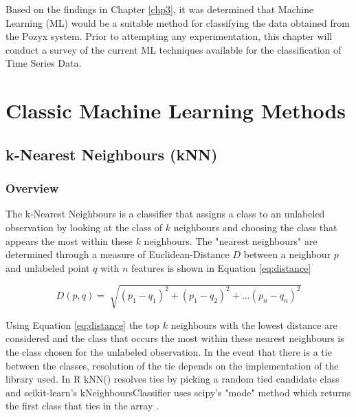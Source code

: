Based on the findings in Chapter \ref{chp3}, it was determined that Machine Learning (ML) would be a suitable method for classifying the data obtained from the Pozyx system. Prior to attempting any experimentation, this chapter will conduct a survey of the current ML techniques available for the classification of Time Series Data. 


\section{Classic Machine Learning Methods}
\subsection{k-Nearest Neighbours (kNN)}
\subsubsection{Overview}
The k-Nearest Neighbours is a classifier that assigns a class to an unlabeled observation by looking at the class of $k$ neighbours and choosing the class that appears the most within these $k$ neighbours. The "nearest neighbours" are determined through a measure of Euclidean-Distance $D$ between a neighbour $p$ and unlabeled point $q$ with $n$ features is shown in Equation \ref{eq:distance} \cite{zhangIntroductionMachineLearning2016}

\begin{equation}
    D(p, q) = \sqrt[]{(p_1 - q_1)^2 + (p_1 - q_2)^2 + ... (p_n - q_n)^2}
    \label{eq:distance}
\end{equation}

Using Equation \ref{eq:distance} the top $k$ neighbours with the lowest distance are considered and the class that occurs the most within these nearest neighbours is the class chosen for the unlabeled observation. In the event that there is a tie between the classes, resolution of the tie depends on the implementation of the library used. In R kNN() resolves ties by picking a random tied candidate class \cite{zhangIntroductionMachineLearning2016} and scikit-learn's kNeighboursClassifier uses scipy's "mode" method which returns the first class that ties in the array \cite{ScipyStatsMode}.

